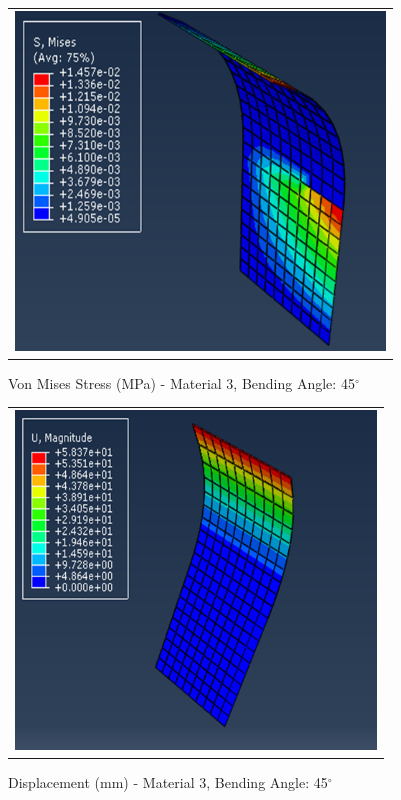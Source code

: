 \documentclass[a4paper,12pt]{article}
\numberwithin{equation}{section}
\numberwithin{figure}{section}
\begin{document}
\begin{figure}[H]
  \centering
  \begin{tabular}{@{}c@{}}
    \includegraphics[width=0.7\linewidth,height=255pt]{Results/Bending/M3_VMS_45.png} \\
  \end{tabular}
  \caption{Von Mises Stress (MPa) - Material 3,  Bending Angle: 45$^{\circ}$ }
\end{figure}

\begin{figure}[H]
  \centering
  \begin{tabular}{@{}c@{}}
    \includegraphics[width=0.7\linewidth,height=255pt]{Results/Bending/M3_DIS_45.png} \\
  \end{tabular}
  \caption{Displacement (mm) - Material 3, Bending Angle: 45$^{\circ}$ }
\end{figure}
\end{document}
